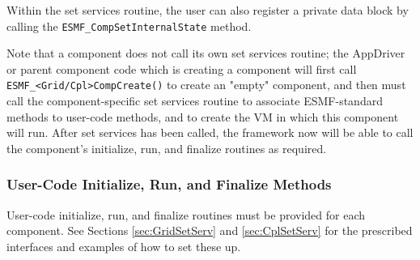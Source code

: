 Within the set services routine, the user can also register a 
private data block by calling the 
{\tt ESMF\_<Grid|Cpl>CompSetInternalState} method.

Note that a component does not call its own set services routine;
the AppDriver or parent component code which is creating a component 
will first call {\tt ESMF\_<Grid/Cpl>CompCreate()} to create an "empty" 
component, and then must call the component-specific set services routine 
to associate ESMF-standard methods to user-code methods, and to create
the VM in which this component will run. After set 
services has been called, the framework
now will be able to call the component's initialize, run, and finalize 
routines as required.  

\subsubsection{User-Code Initialize, Run, and Finalize Methods}

User-code initialize, run, and finalize routines must be provided for
each component.  See Sections \ref{sec:GridSetServ} and \ref{sec:CplSetServ}
for the prescribed interfaces and examples of how to set these up.



